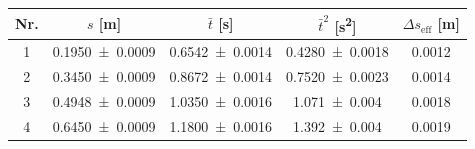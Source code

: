 \begin{tabular}{ccccc}
\hline
Nr. & $s$ [\unit{m}] & $\bar t$ [\unit{s}] & $\bar t^2$ [\unit{s^2}] & $\Delta s_\mathrm{eff}$ [\unit{m}] \\
\hline
1 & \num{0.1950 \pm 0.0009} & \num{0.6542 \pm 0.0014} & \num{0.4280 \pm 0.0018} & 0.0012 \\
2 & \num{0.3450 \pm 0.0009} & \num{0.8672 \pm 0.0014} & \num{0.7520 \pm 0.0023} & 0.0014 \\
3 & \num{0.4948 \pm 0.0009} & \num{1.0350 \pm 0.0016} & \num{1.071 \pm 0.004} & 0.0018 \\
4 & \num{0.6450 \pm 0.0009} & \num{1.1800 \pm 0.0016} & \num{1.392 \pm 0.004} & 0.0019 \\
\hline
\end{tabular}
